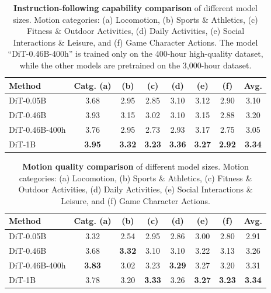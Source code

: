 \begin{table}[tb]
    \centering
    \caption{\textbf{Instruction-following capability comparison} of different model sizes. Motion categories: (a) Locomotion, (b) Sports \& Athletics, (c) Fitness \& Outdoor Activities, (d) Daily Activities, (e) Social Interactions \& Leisure, and (f) Game Character Actions. The model ``DiT-0.46B-400h'' is trained only on the 400-hour high-quality dataset, while the other models are pretrained on the 3,000-hour dataset.}
    \vspace{5pt}
    \label{tab:scalingexp}
    \begin{tabular}{l|cccccc|c}
        \toprule
        Method & Catg. (a) & (b) & (c) & (d) & (e) & (f) & Avg.   \\
        \midrule
        DiT-0.05B & 3.68 & 2.95 & 2.85 & 3.10 & 3.12 & 2.90 & 3.10  \\
        DiT-0.46B & 3.93 & 3.15 & 3.02 & 3.10 & 3.15 & 2.88 & 3.20 \\
        DiT-0.46B-400h & 3.76 & 2.95 & 2.73 & 2.93 & 3.17 & 2.75 & 3.05 \\
        DiT-1B & \textbf{3.95} & \textbf{3.32} & \textbf{3.23} & \textbf{3.36} & \textbf{3.27} & \textbf{2.92} & \textbf{3.34}  \\
        \bottomrule
    \end{tabular}
    \vspace{-10pt}
\end{table}


\begin{table}[tb]
    \centering
    \caption{\textbf{Motion quality comparison} of different model sizes. Motion categories: (a) Locomotion, (b) Sports \& Athletics, (c) Fitness \& Outdoor Activities, (d) Daily Activities, (e) Social Interactions \& Leisure, and (f) Game Character Actions.}
    \vspace{5pt}
    \label{tab:scalingexp_mq}
    \begin{tabular}{l|cccccc|c}
        \toprule
        Method & Catg. (a) & (b) & (c) & (d) & (e) & (f) & Avg.  \\
        \midrule
        DiT-0.05B & 3.32 & 2.54 & 2.95 & 2.86 & 3.00 & 2.80 & 2.91  \\
        DiT-0.46B & 3.68 & \textbf{3.32} & 3.10 & 3.10 & 3.22 & 3.13 & 3.26 \\
        DiT-0.46B-400h & \textbf{3.83} & 3.02 & 3.23 & \textbf{3.29} & 3.27 & 3.20 & 3.31 \\
        DiT-1B & 3.78 & 3.20 & \textbf{3.33} & 3.26 & \textbf{3.27} & \textbf{3.23} & \textbf{3.34}  \\
        \bottomrule
    \end{tabular}
\end{table}










